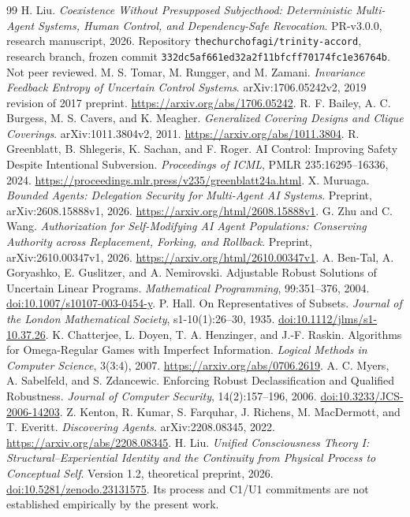 \documentclass[11pt,a4paper]{article}
\theoremstyle{definition}\newtheorem{definition}{Definition}
\begin{document}
\begin{thebibliography}{99}\small
{} H. Liu. \emph{Coexistence Without Presupposed Subjecthood: Deterministic Multi-Agent Systems, Human Control, and Dependency-Safe Revocation}. PR-v3.0.0, research manuscript, 2026. Repository \texttt{thechurchofagi/trinity-accord}, research branch, frozen commit \nolinkurl{332dc5af661ed32a2f11bfcff70174fc1e36764b}. Not peer reviewed.
 M. S. Tomar, M. Rungger, and M. Zamani. \emph{Invariance Feedback Entropy of Uncertain Control Systems}. arXiv:1706.05242v2, 2019 revision of 2017 preprint. \url{https://arxiv.org/abs/1706.05242}.
 R. F. Bailey, A. C. Burgess, M. S. Cavers, and K. Meagher. \emph{Generalized Covering Designs and Clique Coverings}. arXiv:1011.3804v2, 2011. \url{https://arxiv.org/abs/1011.3804}.
 R. Greenblatt, B. Shlegeris, K. Sachan, and F. Roger. AI Control: Improving Safety Despite Intentional Subversion. \emph{Proceedings of ICML}, PMLR 235:16295--16336, 2024. \url{https://proceedings.mlr.press/v235/greenblatt24a.html}.
 X. Muruaga. \emph{Bounded Agents: Delegation Security for Multi-Agent AI Systems}. Preprint, arXiv:2608.15888v1, 2026. \url{https://arxiv.org/html/2608.15888v1}.
 G. Zhu and C. Wang. \emph{Authorization for Self-Modifying AI Agent Populations: Conserving Authority across Replacement, Forking, and Rollback}. Preprint, arXiv:2610.00347v1, 2026. \url{https://arxiv.org/html/2610.00347v1}.
 A. Ben-Tal, A. Goryashko, E. Guslitzer, and A. Nemirovski. Adjustable Robust Solutions of Uncertain Linear Programs. \emph{Mathematical Programming}, 99:351--376, 2004. \href{https://doi.org/10.1007/s10107-003-0454-y}{doi:10.1007/s10107-003-0454-y}.
 P. Hall. On Representatives of Subsets. \emph{Journal of the London Mathematical Society}, s1-10(1):26--30, 1935. \href{https://doi.org/10.1112/jlms/s1-10.37.26}{doi:10.1112/jlms/s1-10.37.26}.
 K. Chatterjee, L. Doyen, T. A. Henzinger, and J.-F. Raskin. Algorithms for Omega-Regular Games with Imperfect Information. \emph{Logical Methods in Computer Science}, 3(3:4), 2007. \url{https://arxiv.org/abs/0706.2619}.
 A. C. Myers, A. Sabelfeld, and S. Zdancewic. Enforcing Robust Declassification and Qualified Robustness. \emph{Journal of Computer Security}, 14(2):157--196, 2006. \href{https://doi.org/10.3233/JCS-2006-14203}{doi:10.3233/JCS-2006-14203}.
 Z. Kenton, R. Kumar, S. Farquhar, J. Richens, M. MacDermott, and T. Everitt. \emph{Discovering Agents}. arXiv:2208.08345, 2022. \url{https://arxiv.org/abs/2208.08345}.
 H. Liu. \emph{Unified Consciousness Theory I: Structural--Experiential Identity and the Continuity from Physical Process to Conceptual Self}. Version 1.2, theoretical preprint, 2026. \href{https://doi.org/10.5281/zenodo.23131575}{doi:10.5281/zenodo.23131575}. Its process and C1/U1 commitments are not established empirically by the present work.
\end{thebibliography}
\end{document}
